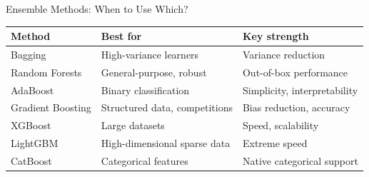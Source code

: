 \begin{frame}{Ensemble Methods: When to Use Which?}
  \renewcommand{\arraystretch}{1.4}
  \begin{center}
  \begin{tabular}{lll}
    \toprule
    \textbf{Method} & \textbf{Best for} & \textbf{Key strength} \\
    \midrule
    Bagging & High-variance learners & Variance reduction \\
    Random Forests & General-purpose, robust & Out-of-box performance \\
    AdaBoost & Binary classification & Simplicity, interpretability \\
    Gradient Boosting & Structured data, competitions & Bias reduction, accuracy \\
    XGBoost & Large datasets & Speed, scalability \\
    LightGBM & High-dimensional sparse data & Extreme speed \\
    CatBoost & Categorical features & Native categorical support \\
    \bottomrule
  \end{tabular}
  \end{center}
\end{frame}

